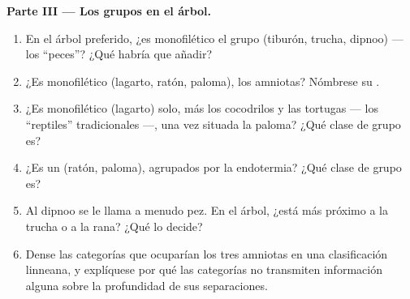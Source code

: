 \begin{problem}
\medskip
\noindent\textbf{Parte III --- Los grupos en el árbol.}
\begin{enumerate}[resume]
  \item En el árbol preferido, ¿es monofilético el grupo (tiburón, trucha,
        dipnoo) --- los ``peces''? ¿Qué  habría que añadir?
  \item ¿Es monofilético (lagarto, ratón, paloma), los amniotas? Nómbrese su
        .
  \item ¿Es monofilético (lagarto) solo, más los cocodrilos y las tortugas
        --- los ``reptiles'' tradicionales ---, una vez situada la paloma?
        ¿Qué clase de grupo es?
  \item ¿Es un  (ratón, paloma), agrupados por la endotermia? ¿Qué
        clase de grupo es?
  \item Al dipnoo se le llama a menudo pez. En el árbol, ¿está más próximo a
        la trucha o a la rana? ¿Qué  lo decide?
  \item Dense las categorías que ocuparían los tres amniotas en una
        clasificación linneana, y explíquese por qué las categorías no
        transmiten información alguna sobre la profundidad de sus
        separaciones.
\end{enumerate}


\end{problem}
